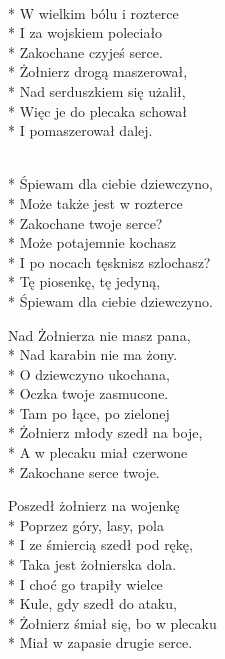 \begin{lyrics}[longestline={Żołnierz śmiał się, bo w plecaku}]

\\*
W wielkim bólu i rozterce\\*
I za wojskiem poleciało\\*
Zakochane czyjeś serce.\\*
\smallskip
Żołnierz drogą maszerował,\\*
Nad serduszkiem się użalił,\\*
Więc je do plecaka schował\\*
I pomaszerował dalej.

\begin{chorus}
\\*
Śpiewam dla ciebie dziewczyno,\\*
Może także jest w rozterce\\*
Zakochane twoje serce?\\*
\smallskip
Może potajemnie kochasz\\*
I po nocach tęsknisz szlochasz?\\*
Tę piosenkę, tę jedyną,\\*
Śpiewam dla ciebie dziewczyno.
\end{chorus}

Nad Żołnierza nie masz pana,\\*
Nad karabin nie ma żony.\\*
O dziewczyno ukochana,\\*
Oczka twoje zasmucone.\\*
\smallskip
Tam po łące, po zielonej\\*
Żołnierz młody szedł na boje,\\*
A w plecaku miał czerwone\\*
Zakochane serce twoje.

\chorusref

Poszedł żołnierz na wojenkę\\*
Poprzez góry, lasy, pola\\*
I ze śmiercią szedł pod rękę,\\*
Taka jest żołnierska dola.\\*
\smallskip
I choć go trapiły wielce\\*
Kule, gdy szedł do ataku,\\*
Żołnierz śmiał się, bo w plecaku\\*
Miał w zapasie drugie serce.

\chorusref
\end{lyrics}



